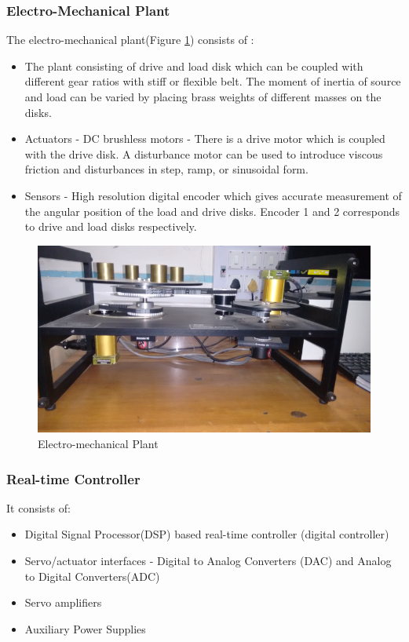 \documentclass[11pt, a4paper]{article}
\begin{document}
\subsubsection{Electro-Mechanical Plant}
The electro-mechanical plant(Figure \ref{Fig2}) consists of :
\begin{itemize}
\item The plant consisting of drive and load disk which can be coupled with different gear ratios with stiff or flexible belt. The moment of inertia of source and load can be varied by placing brass weights of different masses on the disks.
\item Actuators - DC brushless motors - There is a drive motor which is coupled with the drive disk. A disturbance motor can be used to introduce viscous friction and disturbances in step, ramp, or sinusoidal form.
\item Sensors - High resolution digital encoder which gives accurate measurement of the angular position of the load and drive disks. Encoder 1 and 2 corresponds to drive and load disks respectively.
\end{itemize}
\begin{figure}[H]
\centering
\includegraphics[width = \textwidth]{plant.png}
\caption{Electro-mechanical Plant}
\label{Fig2}
\end{figure}
\subsubsection{Real-time Controller}
It consists of:
\begin{itemize}
\item Digital Signal Processor(DSP) based real-time controller (digital controller)
\item Servo/actuator interfaces - Digital to Analog Converters (DAC) and Analog to Digital Converters(ADC)
\item Servo amplifiers
\item Auxiliary Power Supplies
\end{itemize}
\end{document}
